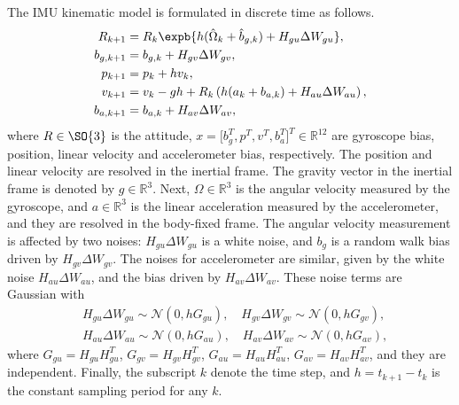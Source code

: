 The IMU kinematic model is formulated in discrete time as follows.
\begin{align}
	R_{k+1} &= R_k \expb{ h(\hat{\Omega}_k + \hat{b}_{g,k}) + H_{gu}\Delta W_{gu} }, \label{eqn:posEst-kinematics-attitude} \\
	b_{g,k+1} &= b_{g,k} + H_{gv}\Delta W_{gv}, \label{eqn:posEst-kinematics-gyrobias} \\
	p_{k+1} &= p_k + hv_k, \label{eqn:posEst-kinematics-pos} \\
	v_{k+1} &= v_k - gh + R_k\left( h(a_k+b_{a,k}) + H_{au}\Delta W_{au} \right), \label{eqn:posEst-kinematics-velocity} \\
	b_{a,k+1} &= b_{a,k} + H_{av}\Delta W_{av}, \label{eqn:posEst-kinematics-accebias}
\end{align}
where $R\in\SO{3}$ is the attitude, $x = \big[b_g^T, p^T, v^T, b_a^T\big]^T \in \mathbb{R}^{12}$ are gyroscope bias, position, linear velocity and accelerometer bias, respectively.
The position and linear velocity are resolved in the inertial frame.
The gravity vector in the inertial frame is denoted by $g\in\mathbb{R}^3$.
Next, $\Omega\in\mathbb{R}^3$ is the angular velocity measured by the gyroscope, and $a\in\mathbb{R}^3$ is the linear acceleration measured by the accelerometer, and they are resolved in the body-fixed frame.
The angular velocity measurement is affected by two noises: $H_{gu}\Delta W_{gu}$ is a white noise, and $b_g$ is a random walk bias driven by $H_{gv}\Delta W_{gv}$.
The noises for accelerometer are similar, given by the white noise $H_{au}\Delta W_{au}$, and the bias driven by $H_{av}\Delta W_{av}$.
These noise terms are Gaussian with
\begin{align}
	&H_{gu}\Delta W_{gu} \sim \mathcal{N}(0,hG_{gu}), \quad H_{gv}\Delta W_{gv} \sim \mathcal{N}(0,hG_{gv}), \label{eqn:posEst-gyroNoise} \\
	&H_{au}\Delta W_{au} \sim \mathcal{N}(0,hG_{au}), \quad H_{av}\Delta W_{av} \sim \mathcal{N}(0,hG_{av}),
\end{align}
where $G_{gu} = H_{gu}H_{gu}^T$, $G_{gv} = H_{gv}H_{gv}^T$, $G_{au} = H_{au}H_{au}^T$, $G_{av} = H_{av}H_{av}^T$, and they are independent.
Finally, the subscript $k$ denote the time step, and $h = t_{k+1}-t_k$ is the constant sampling period for any $k$.

